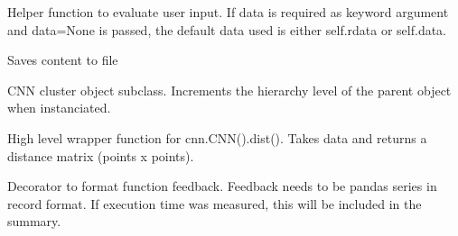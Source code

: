 \documentclass[letterpaper,10pt,english]{sphinxmanual}
\begin{document}
\begin{fulllineitems}

\begin{fulllineitems}
\label{\detokenize{documentation:cnn.CNN.query_data}}
Helper function to evaluate user input. If data is required as
keyword argument and data=None is passed, the default data used is
either self.rdata or self.data.

\end{fulllineitems}


\begin{fulllineitems}
\label{\detokenize{documentation:cnn.CNN.save}}
Saves content to file

\end{fulllineitems}


\end{fulllineitems}


\begin{fulllineitems}
\label{\detokenize{documentation:cnn.CNNChild}}
CNN cluster object subclass. Increments the hierarchy level of
the parent object when instanciated.

\end{fulllineitems}


\begin{fulllineitems}
\label{\detokenize{documentation:cnn.dist}}
High level wrapper function for cnn.CNN().dist(). Takes data and
returns a distance matrix (points x points).

\end{fulllineitems}


\begin{fulllineitems}
\label{\detokenize{documentation:cnn.recorded}}
Decorator to format function feedback.  Feedback needs to be
pandas series in record format.  If execution time was measured,
this will be included in the summary.

\end{fulllineitems}
\end{document}
